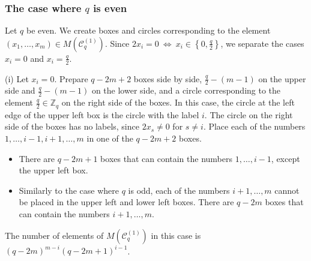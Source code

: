 \documentclass{article}
\theoremstyle{plain}
\theoremstyle{definition}
\theoremstyle{remark}
\numberwithin{equation}{section}
\newcommand{\Cc}{\mathcal{C}}
\begin{document}
\subsubsection{The case where $q$ is even}\label{sec-TypeC-rest-2x_i=0-even}
Let $q$ be even.
We create boxes and circles corresponding to the element $(x_1,\dots,x_m)\in M(\Cc^{(1)}_q)$.
Since $\displaystyle 2x_i=0\ \Leftrightarrow\ x_i\in \left\{0,\frac{q}{2}\right\}$, we separate the cases $x_i=0$ and $\displaystyle x_i=\frac{q}{2}$.

(i) Let $x_i=0$.
Prepare $q-2m+2$ boxes side by side, $\displaystyle \frac{q}{2}-(m-1)$ on the upper side and $\displaystyle \frac{q}{2}-(m-1)$ on the lower side, and a circle corresponding to the element $\displaystyle \frac{q}{2}\in\mathbb{Z}_q$ on the right side of the boxes.
In this case, the circle at the left edge of the upper left box is the circle with the label $i$.
The circle on the right side of the boxes has no labels, since $2x_s\neq 0$ for $s\neq i$.
Place each of the numbers $1,\dots,i-1,i+1,\dots,m$ in one of the $q-2m+2$ boxes.
\begin{itemize}
\item There are $q-2m+1$ boxes that can contain the numbers $1,\dots,i-1$, except the upper left box.

\item Similarly to the case where $q$ is odd, each of the numbers $i+1,\dots,m$ cannot be placed in the upper left and lower left boxes.
There are $q-2m$ boxes that can contain the numbers $i+1,\dots,m$.
\end{itemize}
The number of elements of $M(\Cc^{(1)}_q)$ in this case is $(q-2m)^{m-i}(q-2m+1)^{i-1}$.
\end{document}
